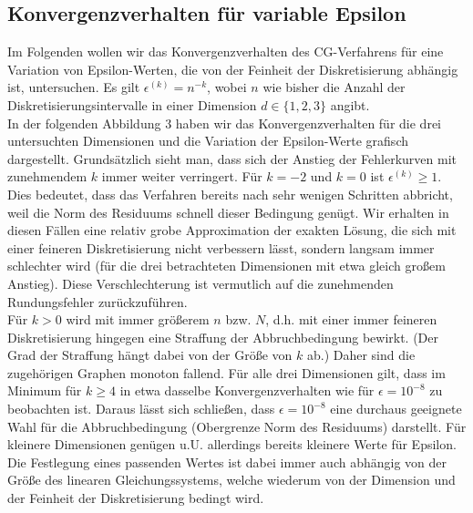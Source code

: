\documentclass{scrartcl}
\begin{document}
\subsection{Konvergenzverhalten für variable Epsilon}
Im Folgenden wollen wir das Konvergenzverhalten des CG-Verfahrens für eine Variation von Epsilon-Werten, die von der Feinheit der Diskretisierung abhängig ist, untersuchen.
Es gilt $\epsilon^{(k)}=n^{-k}$, wobei $n$ wie bisher die Anzahl der Diskretisierungsintervalle in einer Dimension $d\in\{1, 2, 3\}$ angibt. \\
In der folgenden Abbildung 3 haben wir das Konvergenzverhalten für die drei untersuchten Dimensionen und die Variation der Epsilon-Werte grafisch dargestellt.
Grundsätzlich sieht man, dass sich der Anstieg der Fehlerkurven mit zunehmendem $k$ immer weiter verringert.
Für $k=-2$ und $k=0$ ist $\epsilon^{(k)}\geq 1$.
Dies bedeutet, dass das Verfahren bereits nach sehr wenigen Schritten abbricht, weil die Norm des Residuums schnell dieser Bedingung genügt.
Wir erhalten in diesen Fällen eine relativ grobe Approximation der exakten Lösung, die sich mit einer feineren Diskretisierung nicht verbessern lässt, sondern langsam immer schlechter wird (für die drei betrachteten Dimensionen mit etwa gleich großem Anstieg).
Diese Verschlechterung ist vermutlich auf die zunehmenden Rundungsfehler zurückzuführen. \\
Für $k>0$ wird mit immer größerem $n$ bzw. $N$, d.h. mit einer immer feineren Diskretisierung hingegen eine Straffung der Abbruchbedingung bewirkt.
(Der Grad der Straffung hängt dabei von der Größe von $k$ ab.)
Daher sind die zugehörigen Graphen monoton fallend.
Für alle drei Dimensionen gilt, dass im Minimum für $k\geq4$ in etwa dasselbe Konvergenzverhalten wie für $\epsilon = 10^{-8}$ zu beobachten ist.
Daraus lässt sich schließen, dass $\epsilon = 10^{-8}$ eine durchaus geeignete Wahl für die Abbruchbedingung (Obergrenze Norm des Residuums) darstellt.
Für kleinere Dimensionen genügen u.U. allerdings bereits kleinere Werte für Epsilon.
Die Festlegung eines passenden Wertes ist dabei immer auch abhängig von der Größe des linearen Gleichungssystems, welche wiederum von der Dimension und der Feinheit der Diskretisierung bedingt wird. \\
\end{document}
